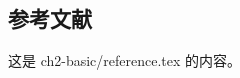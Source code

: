 \begin{ujnreference}
\section[参考文献]{参\enspace 考\enspace 文\enspace 献}
这是 ch2-basic/reference.tex 的内容。
\end{ujnreference}
